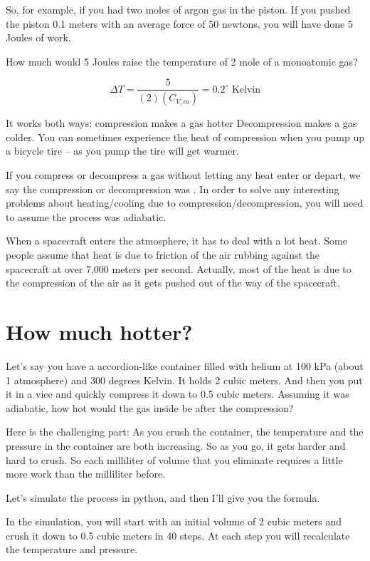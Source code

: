So, for example,  if you had two moles of argon gas in the piston.  If you pushed the piston 0.1 meters with an average force of 50 newtons,  you will have done 5 Joules of work.

How much would 5 Joules raise the temperature of 2 mole of a monoatomic gas?  

$$\Delta T = \frac{5}{(2)(C_{V,m})} = 0.2^\circ \text{ Kelvin}$$ 

It works both ways:  compression makes a gas hotter  Decompression makes a gas colder.  You can sometimes experience the heat of compression when you pump up a bicycle tire -- as you pump the tire will get warmer.

If you compress or decompress a gas without letting any heat enter or depart,  we say the compression or decompression was .  In order to solve any interesting problems about heating/cooling due to compression/decompression,  you will need to assume the process was adiabatic.

When a spacecraft enters the atmosphere,  it has to deal with a lot heat.   Some people assume that heat is due to friction of the air rubbing against the 
spacecraft at over 7,000 meters per second.  Actually,  most of the heat is due to the compression of the air as it gets pushed out of the way of the spacecraft.

\section{How much hotter?}

Let's say you have a accordion-like container filled with helium at 100 kPa (about 1 atmosphere) and 300 degrees Kelvin.  It holds 2 cubic meters.    And then you put it in a vice and quickly compress it down to 0.5 cubic meters.  Assuming it was adiabatic,  how hot would the gas inside be after the compression?

Here is the challenging part:  As you crush the container,  the temperature and the pressure in the container are both increasing.  So as you go,  it gets harder and hard to crush.  So each milliliter of volume that you eliminate requires a little more work than the milliliter before.

Let's simulate the process in python,  and then I'll give you the formula.  

In the simulation, you will start with an initial volume of 2 cubic meters and crush it down to 0.5 cubic meters in 40 steps.  At each step you will recalculate the temperature and pressure.

